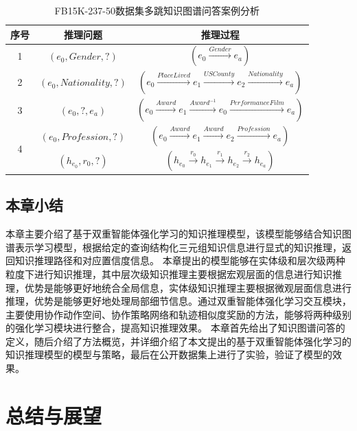 \documentclass[algorithmlist, AutoFakeBold, AutoFakeSlant, figurelist, tablelist, nomlist, engineering]{seuthesix}
\begin{document}
\begin{table}[]
  \centering
  \begin{tabular*}{0.95\textwidth}{@{\extracolsep{\fill}}ccc}
  \toprule[1pt] 
  序号 & 推理问题 & 推理过程 \\ \hline
  1 & $(e_0, Gender, ?)$ & $(e_0 \xrightarrow{Gender} e_a)$ \\
  2 & $(e_0, Nationality, ?)$ & $(e_0 \xrightarrow{PlaceLived} e_1 \xrightarrow{USCounty} e_2 \xrightarrow{Nationality} e_a)$ \\
  3 & $(e_0, ?, e_a)$ & $(e_0 \xrightarrow{Award} e_1 \xrightarrow{Award^{-1}} e_0 \xrightarrow{PerformanceFilm} e_a) $ \\
  \multirow{2}{*}{4} & $(e_0, Profession, ?)$ & $(e_0 \xrightarrow{Award} e_1 \xrightarrow{Award} e_2 \xrightarrow{Profession} e_a)$ \\
  & $(h_{e_0}, r_0, ?)$ & $(h_{e_0} \xrightarrow{r_0} h_{e_1} \xrightarrow{r_1} h_{e_2} \xrightarrow{r_2} h_{e_a})$ \\
  \bottomrule[1pt]
  \end{tabular*}
  \caption{FB15K-237-50数据集多跳知识图谱问答案例分析}
  \label{Experiment2_CaseStudy}
\end{table}

\section{本章小结}
本章主要介绍了基于双重智能体强化学习的知识推理模型，该模型能够结合知识图谱表示学习模型，根据给定的查询结构化三元组知识信息进行显式的知识推理，返回知识推理路径和对应置信度信息。
本章提出的模型能够在实体级和层次级两种粒度下进行知识推理，其中层次级知识推理主要根据宏观层面的信息进行知识推理，优势是能够更好地统合全局信息，实体级知识推理主要根据微观层面信息进行推理，优势是能够更好地处理局部细节信息。通过双重智能体强化学习交互模块，主要使用协作动作空间、协作策略网络和轨迹相似度奖励的方法，能够将两种级别的强化学习模块进行整合，提高知识推理效果。
本章首先给出了知识图谱问答的定义，随后介绍了方法概览，并详细介绍了本文提出的基于双重智能体强化学习的知识推理模型的模型与策略，最后在公开数据集上进行了实验，验证了模型的效果。


\chapter{总结与展望}
\end{document}
